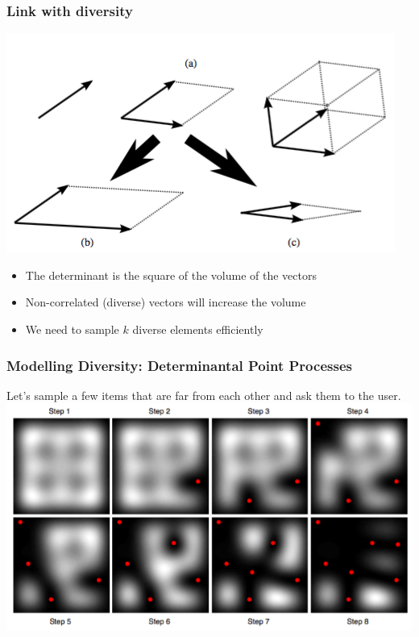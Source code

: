\documentclass[handout]{beamer}
\begin{document}
\begin{frame}
    \frametitle{Link with diversity}
    \centering
    \includegraphics[width=0.7\linewidth]{figures/vol.png}
    \begin{itemize}
    \item The determinant is the square of the volume of the vectors
    \item Non-correlated (\alert{diverse}) vectors will increase the volume
    \item We need to sample $k$ diverse elements efficiently
    \end{itemize}
\end{frame}

\begin{frame}
    \frametitle{Modelling Diversity: Determinantal Point Processes}
    Let's sample a few items that are \alert{far from each other} and ask them to the user.
    \includegraphics[width=\linewidth]{figures/dpp.png}
\end{frame}
\end{document}

